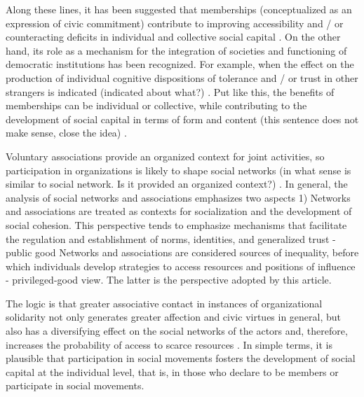 Along these lines, it has been suggested that memberships (conceptualized as an expression of civic commitment) contribute to improving accessibility and / or counteracting deficits in individual and collective social capital \parencite{benton_uniters_2016,small_villa_2004,son_social_2008}. On the other hand, its role as a mechanism for the integration of societies and functioning of democratic institutions has been recognized. For example, when the effect on the production of individual cognitive dispositions of tolerance and / or trust in other strangers is indicated {\color{blue} (indicated about what?)}  \parencite{cote_social_2015,putnam_bowling_2000,tocqueville_democracy_1980}. Put like this, the benefits of memberships can be individual or collective, while contributing to the development of social capital in terms of form and content {\color{blue} (this sentence does not make sense, close the idea)}  \parencite{moody_building_2009}. 
\bigskip

Voluntary associations provide an organized context for joint activities, so participation in organizations is likely to shape social networks {\color{blue} (in what sense is similar to social network. Is it provided an organized context?)} \parencite{feld_focused_1981,mcpherson_social_1992}. In general, the analysis of social networks and associations emphasizes two aspects 1) Networks and associations are treated as contexts for socialization and the development of social cohesion. This perspective tends to emphasize mechanisms that facilitate the regulation and establishment of norms, identities, and generalized trust \parencite{glanville_voluntary_2004,glanville_why_2016,paxton_association_2007,paxton_trust_2018} - public good Networks and associations are considered sources of inequality, before which individuals develop strategies to access resources and positions of influence \parencite{bekkers_social_2008} - privileged-good view. The latter is the perspective adopted by this article.

\bigskip

The logic is that greater associative contact in instances of organizational solidarity not only generates greater affection and civic virtues in general, but also has a diversifying effect on the social networks of the actors and, therefore, increases the probability of access to scarce resources \parencite{diani_social_1997,malinick_network_2013,tindall_network_2012,benton_uniters_2016}. In simple terms, it is plausible that participation in social movements fosters the development of social capital at the individual level, that is, in those who declare to be members or participate in social movements. 
\bigskip

